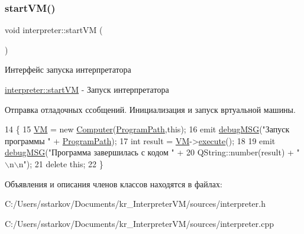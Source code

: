 \subsubsection{\texorpdfstring{start\+V\+M()}{startVM()}}
{\footnotesize\ttfamily void interpreter\+::start\+VM (\begin{DoxyParamCaption}{ }\end{DoxyParamCaption})}



Интерфейс запуска интерпретатора 

\hyperlink{classinterpreter_af9ed8afd864c69cfd1ec1e849b2d1542}{interpreter\+::start\+VM} -\/ Запуск интерпретатора

Отправка отладочных ссобщений. Инициализация и запуск вртуальной машины. 
\begin{DoxyCode}
14 \{
15      \hyperlink{classinterpreter_a0b900e0016eab9306c6f70e93900fe09}{VM} = \textcolor{keyword}{new} \hyperlink{class_computer}{Computer}(\hyperlink{classinterpreter_acafdc7a0e329a4ed0f79930ed33f52be}{ProgramPath},\textcolor{keyword}{this});
16      emit \hyperlink{classinterpreter_a60e0781065c7ae88bdcaaa22729dc458}{debugMSG}(\textcolor{stringliteral}{"Запуск программы "} + \hyperlink{classinterpreter_acafdc7a0e329a4ed0f79930ed33f52be}{ProgramPath});
17      \textcolor{keywordtype}{int} result = \hyperlink{classinterpreter_a0b900e0016eab9306c6f70e93900fe09}{VM}->\hyperlink{class_computer_a4303af6a549fc8f792de0d2d18a9e05f}{execute}();
18 
19      emit \hyperlink{classinterpreter_a60e0781065c7ae88bdcaaa22729dc458}{debugMSG}(\textcolor{stringliteral}{"Программа завершилась с кодом "} +
20                    QString::number(result) + \textcolor{stringliteral}{"\(\backslash\)n\(\backslash\)n"});
21      \textcolor{keyword}{delete} \textcolor{keyword}{this};
22 \}
\end{DoxyCode}


Объявления и описания членов классов находятся в файлах\+:\begin{DoxyCompactItemize}
\item 
C\+:/\+Users/sstarkov/\+Documents/kr\+\_\+\+Interpreter\+V\+M/sources/interpreter.\+h\item 
C\+:/\+Users/sstarkov/\+Documents/kr\+\_\+\+Interpreter\+V\+M/sources/interpreter.\+cpp\end{DoxyCompactItemize}
